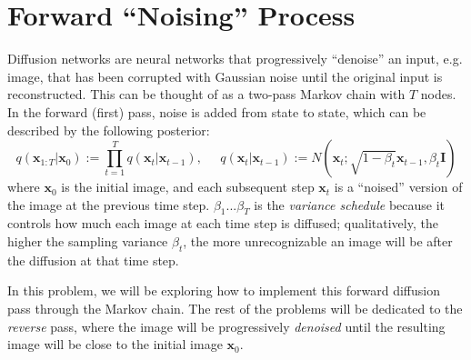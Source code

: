 \documentclass{article}
\begin{document}
\section{Forward ``Noising'' Process}
Diffusion networks are neural networks that progressively ``denoise'' an input, e.g. image, that has been corrupted with Gaussian noise until the original input is reconstructed. This can be thought of as a two-pass Markov chain with $T$ nodes. In the forward (first) pass, noise is added from state to state, which can be described by the following posterior: 
\begin{equation}
    q(\textbf{x}_{1:T}|\textbf{x}_{0}) := \prod_{t=1}^{T} q(\textbf{x}_{t}|\textbf{x}_{t - 1}),\;\;\;\;\;q(\textbf{x}_{t}|\textbf{x}_{t - 1}) := N(\textbf{x}_{t}; \sqrt{1 - \beta_{t}}\textbf{x}_{t-1}, \beta_{t} \textbf{I})
\end{equation}
where $\textbf{x}_{0}$ is the initial image, and each subsequent step $\textbf{x}_{t}$ is a ``noised'' version of the image at the previous time step. $\beta_{1}$...$\beta_{T}$ is the \textit{variance schedule} because it controls how much each image at each time step is diffused; qualitatively, the higher the sampling variance $\beta_{t}$, the more unrecognizable an image will be after the diffusion at that time step. 




\noindent In this problem, we will be exploring how to implement this forward diffusion pass through the Markov chain. The rest of the problems will be dedicated to the \textit{reverse} pass, where the image will be progressively \textit{denoised} until the resulting image will be close to the initial image $\textbf{x}_{0}$.
\end{document}
